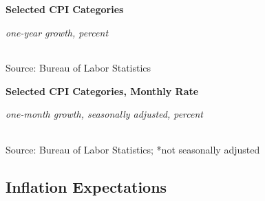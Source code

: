 \documentclass{report}
\begin{document}
{\begin{minipage}{0.76\textwidth} 
\small 
\vspace{1.5mm}

\normalsize \textbf{Selected CPI Categories}\\
\footnotesize{\textit{one-year growth, percent}\\
\hspace*{-3mm}  \setlength{\tabcolsep}{2.6pt} \color{black!90}
		{\renewcommand{\arraystretch}{1.5}
\begin{tabular}{p{42mm} R{8.0mm} R{8.0mm} R{8.0mm} R{8.0mm}
		 		 R{8.0mm} R{10.0mm} R{12.0mm}} %
			  \hline
		\end{tabular}}}
\vspace{-2mm}		
		
\footnotesize{Source: Bureau of Labor Statistics}
\end{minipage}
\newpage
\begin{minipage}{0.76\textwidth} 
\vspace*{-3mm}
\small 
\end{minipage}
\vspace{1mm}

\normalsize \textbf{Selected CPI Categories, Monthly Rate}\\
\footnotesize{\textit{one-month growth, seasonally adjusted, percent}\\
\hspace*{-3mm}  \setlength{\tabcolsep}{2.6pt} \color{black!90}
		{\renewcommand{\arraystretch}{1.39}
\begin{tabular}{p{38mm} R{8.2mm} R{8.2mm} R{8.2mm} R{8.2mm} R{8.2mm} R{8.2mm} 
		R{8.2mm} R{8.2mm}} %
			  \hline
		\end{tabular}}}
\vspace{-2mm}		
		
\footnotesize{Source: Bureau of Labor Statistics; *not seasonally adjusted
\newpage
\hypertarget{prie}{\label{prie}}
\begin{minipage}{0.76\textwidth}
\subsection*{Inflation Expectations}
\vspace{-1mm}


\end{minipage}}}
\end{document}
